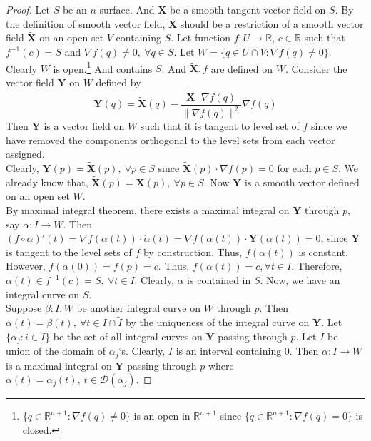 \begin{proof}
	Let $S$ be an $n$-surface. And $\boldsymbol{X}$ be a smooth tangent vector field on $S$. By the definition of smooth vector field, $\boldsymbol{X}$ should be a restriction of a smooth vector field $\tilde{\boldsymbol{X}}$ on an open set $V$ containing $S$. Let function $f : U \to \mathbb{R}$, $c \in \mathbb{R}$ such that $f^{-1}(c) = S$ and $\nabla f(q) \ne 0,\ \forall q \in S$. Let $W = \{ q \in U \cap V : \nabla f(q) \ne 0 \}$. Clearly $W$ is open.\footnote{$\{ q \in \mathbb{R}^{n+1} : \nabla f(q) \ne 0\}$ is an open in $\mathbb{R}^{n+1}$ since $\{ q \in \mathbb{R}^{n+1} : \nabla f(q) = 0 \}$ is closed.} And contains $S$. And $\tilde{\boldsymbol{X}}, f$ are defined on $W$. Consider the vector field $\boldsymbol{Y}$ on $W$ defined by
	$$ \boldsymbol{Y}(q) = \tilde{\boldsymbol{X}}(q) - \frac{\tilde{\boldsymbol{X}} \cdot \nabla f(q)}{\|\nabla f(q)\|^2} \nabla f(q) $$
	Then $\boldsymbol{Y}$ is a vector field on $W$ such that it is tangent to level set of $f$ since we have removed the components orthogonal to the level sets from each vector assigned.\\

	Clearly, $\boldsymbol{Y}(p) = \tilde{\boldsymbol{X}}(p),\ \forall p \in S$ since $\tilde{\boldsymbol{X}}(p) \cdot \nabla f(p) = 0$ for each $p \in S$.  We already know that, $\tilde{\boldsymbol{X}}(p) = \boldsymbol{X}(p),\ \forall p \in S$. Now $\boldsymbol{Y}$ is a smooth vector defined on an open set $W$.\\

	By maximal integral theorem, there exists a maximal integral on $\boldsymbol{Y}$ through $p$, say $\alpha : I \to W$.
	Then $(f \circ \alpha)'(t) = \nabla f(\alpha(t)) \cdot \dot\alpha(t) = \nabla f(\alpha(t)) \cdot \boldsymbol{Y}(\alpha(t)) = 0$, since $\boldsymbol{Y}$ is tangent to the level sets of $f$ by construction. Thus, $f(\alpha(t))$ is constant. However, $f(\alpha(0)) = f(p) = c$. Thus, $f(\alpha(t)) = c, \forall t \in I$. Therefore, $\alpha(t) \in f^{-1}(c) = S,\ \forall t \in I$. Clearly, $\alpha$ is contained in $S$. Now, we have an integral curve on $S$.\\

	Suppose $\beta : \tilde{I} : W$ be another integral curve on $W$ through $p$. Then $\alpha(t) = \beta(t),\ \forall t \in I \cap \tilde{I}$ by the uniqueness of the integral curve on $\boldsymbol{Y}$. Let $\{ \alpha_j : i \in I\}$ be the set of all integral curves on $\boldsymbol{Y}$ passing through $p$. Let $I$ be union of the domain of $\alpha_j$`s.  Clearly, $I$ is an interval containing $0$. Then $\alpha : I \to W$ is a maximal integral on $\boldsymbol{Y}$ passing through $p$ where $\alpha(t) = \alpha_j(t),\ t \in \mathscr{D}(\alpha_j)$.
\end{proof}

